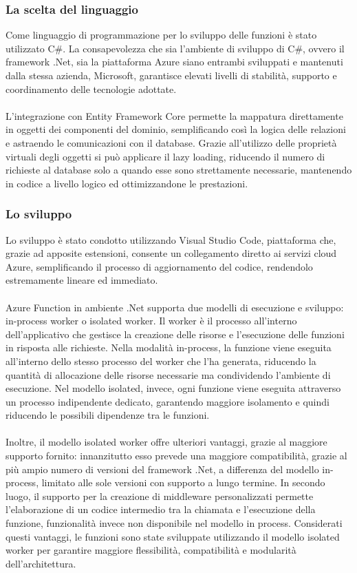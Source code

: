 \subsubsection{La scelta del linguaggio}
Come linguaggio di programmazione per lo sviluppo delle funzioni è stato utilizzato C\#.
La consapevolezza che sia l’ambiente di sviluppo di C\#, ovvero il framework .Net, sia la piattaforma Azure siano entrambi sviluppati e mantenuti dalla stessa azienda, Microsoft,
garantisce elevati livelli di stabilità, supporto e coordinamento delle tecnologie adottate.\\
\\
L’integrazione con Entity Framework Core permette la mappatura direttamente in oggetti dei componenti del dominio, 
semplificando così la logica delle relazioni e astraendo le comunicazioni con il database.
Grazie all’utilizzo delle proprietà virtuali degli oggetti si può applicare il lazy loading, 
riducendo il numero di richieste al database solo a quando esse sono strettamente necessarie, mantenendo in codice a livello logico ed ottimizzandone le prestazioni.
\subsubsection{Lo sviluppo}
Lo sviluppo è stato condotto utilizzando Visual Studio Code, piattaforma che, grazie ad apposite estensioni,
consente un collegamento diretto ai servizi cloud Azure, semplificando il processo di aggiornamento del codice, rendendolo estremamente lineare ed immediato.\\
\\
Azure Function in ambiente .Net supporta due modelli di esecuzione e sviluppo: in-process worker o isolated worker.
Il worker è il processo all’interno dell’applicativo che gestisce la creazione delle risorse e l’esecuzione delle funzioni in risposta alle richieste.
Nella modalità in-process, la funzione viene eseguita all’interno dello stesso processo del worker che l’ha generata,
riducendo la quantità di allocazione delle risorse necessarie ma condividendo l’ambiente di esecuzione.
Nel modello isolated, invece, ogni funzione viene eseguita attraverso un processo indipendente dedicato,
garantendo maggiore isolamento e quindi riducendo le possibili dipendenze tra le funzioni. \\
\\
Inoltre, il modello isolated worker offre ulteriori vantaggi, grazie al maggiore supporto fornito:
innanzitutto esso prevede una maggiore compatibilità, grazie al più ampio numero di versioni del framework .Net,
a differenza del modello in-process, limitato alle sole versioni con supporto a lungo termine.
In secondo luogo, il supporto per la creazione di middleware personalizzati 
permette l’elaborazione di un codice intermedio tra la chiamata e l’esecuzione della funzione,
funzionalità invece non disponibile nel modello in process.
Considerati questi vantaggi, le funzioni sono state sviluppate utilizzando il modello isolated worker 
per garantire maggiore flessibilità, compatibilità e modularità dell’architettura.
\clearpage
